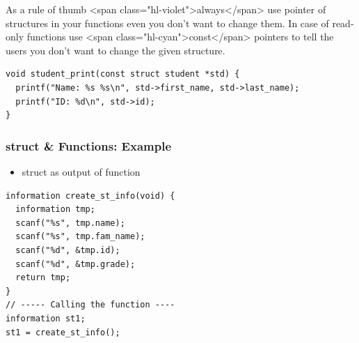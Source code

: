 \documentclass{../c-lecture}
\begin{document}
\begin{frame}[fragile]
  \begin{block}{}
      As a rule of thumb <span class="hl-violet">always</span> use pointer of
      structures in your functions even you don't want to change them. In case
      of read-only functions use <span class="hl-cyan">const</span> pointers to
      tell the users you don't want to change the given structure.
  \end{block}
  \begin{verbatim}
void student_print(const struct student *std) {
  printf("Name: %s %s\n", std->first_name, std->last_name);
  printf("ID: %d\n", std->id);
}
  \end{verbatim}
\end{frame}

\begin{frame}[fragile]
  \frametitle{struct \& Functions: Example}
  \begin{itemize}
    \item struct as output of function
  \end{itemize}
  \begin{verbatim}
information create_st_info(void) {
  information tmp;
  scanf("%s", tmp.name);
  scanf("%s", tmp.fam_name);
  scanf("%d", &tmp.id);
  scanf("%d", &tmp.grade);
  return tmp;
}
// ----- Calling the function ----
information st1;
st1 = create_st_info();
  \end{verbatim}
\end{frame}
\end{document}
